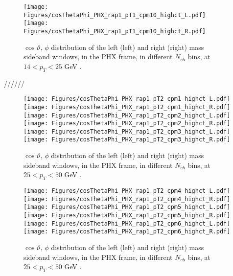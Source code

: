 \documentclass[12pt]{article}
\begin{document}
\begin{figure}[htbp]
\centering
\texttt{[image: Figures/cosThetaPhi\_PHX\_rap1\_pT1\_cpm10\_highct\_L.pdf]}
\texttt{[image: Figures/cosThetaPhi\_PHX\_rap1\_pT1\_cpm10\_highct\_R.pdf]}
\caption{$\cos\vartheta,\,\phi$ distribution of the left (left) and
  right (right) mass sideband windows, in the PHX frame, in different
  $N_{ch}$ bins, at $14 < p_{T} < 25$ GeV .}
\end{figure}
\clearpage

//////
\begin{figure}[htbp]
\centering
\texttt{[image: Figures/cosThetaPhi\_PHX\_rap1\_pT2\_cpm1\_highct\_L.pdf]}
\texttt{[image: Figures/cosThetaPhi\_PHX\_rap1\_pT2\_cpm1\_highct\_R.pdf]}
\texttt{[image: Figures/cosThetaPhi\_PHX\_rap1\_pT2\_cpm2\_highct\_L.pdf]}
\texttt{[image: Figures/cosThetaPhi\_PHX\_rap1\_pT2\_cpm2\_highct\_R.pdf]}
\texttt{[image: Figures/cosThetaPhi\_PHX\_rap1\_pT2\_cpm3\_highct\_L.pdf]}
\texttt{[image: Figures/cosThetaPhi\_PHX\_rap1\_pT2\_cpm3\_highct\_R.pdf]}
\caption{$\cos\vartheta,\,\phi$ distribution of the left (left) and
  right (right) mass sideband windows, in the PHX frame, in different
  $N_{ch}$ bins, at $25 < p_{T} < 50$ GeV .}
\end{figure}
\clearpage

\begin{figure}[htbp]
\centering
\texttt{[image: Figures/cosThetaPhi\_PHX\_rap1\_pT2\_cpm4\_highct\_L.pdf]}
\texttt{[image: Figures/cosThetaPhi\_PHX\_rap1\_pT2\_cpm4\_highct\_R.pdf]}
\texttt{[image: Figures/cosThetaPhi\_PHX\_rap1\_pT2\_cpm5\_highct\_L.pdf]}
\texttt{[image: Figures/cosThetaPhi\_PHX\_rap1\_pT2\_cpm5\_highct\_R.pdf]}
\texttt{[image: Figures/cosThetaPhi\_PHX\_rap1\_pT2\_cpm6\_highct\_L.pdf]}
\texttt{[image: Figures/cosThetaPhi\_PHX\_rap1\_pT2\_cpm6\_highct\_R.pdf]}
\caption{$\cos\vartheta,\,\phi$ distribution of the left (left) and
  right (right) mass sideband windows, in the PHX frame, in different
  $N_{ch}$ bins, at $25 < p_{T} < 50$ GeV .}
\end{figure}
\clearpage
\end{document}
